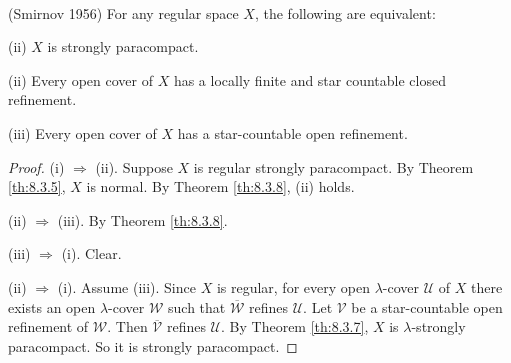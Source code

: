 \documentclass[jiang8iv.tex]{subfiles}
\begin{document}
{\corollary{} \label{cor:8.3.9}
  \textup{(\hstretch{1.8}{[}Smirnov 1956\hstretch{1.8}{]}\textsuperscript{\cite{Smirnov}})}
For any regular space $X$, the following are equivalent:

\textup{(ii)}  $X$ is strongly paracompact.

\textup{(ii)}  Every open cover of $X$ has a locally finite and 
star countable closed refinement.

\textup{(iii)}  Every open cover of $X$ has a star-countable open refinement.
}

\begin{proof}  (i) $\Rightarrow$ (ii).
 Suppose $X$ is regular strongly paracompact. 
 By Theorem \ref{th:8.3.5}, 
$X$ is normal. By Theorem \ref{th:8.3.8}, (ii) holds.

(ii) $\Rightarrow$ (iii). By Theorem \ref{th:8.3.8}.

(iii) $\Rightarrow$ (i). Clear.

(ii) $\Rightarrow$ (i). Assume (iii). Since $X$ is regular, for every open 
$\lambda$-cover $\mathscr{U}$ of $X$ there exists an open $\lambda$-cover
 $\mathscr{W}$  such that $\mathscr{\overline{W}}$ 
 refines $\mathscr{U}$. 
 Let $\mathscr{V}$ be a star-countable open refinement 
 of $\mathscr{W}$. Then $\mathscr{\overline{V}}$ refines $\mathscr{U}$. 
 By Theorem \ref{th:8.3.7}, $X$ is $\lambda$-strongly paracompact. So it is
strongly paracompact.
\end{proof}
\end{document}
